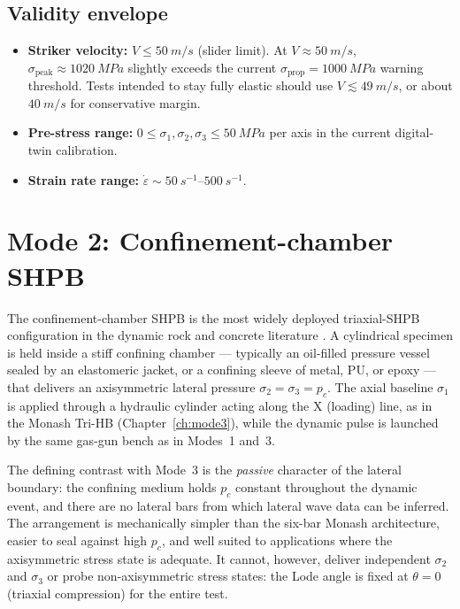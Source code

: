 \documentclass[11pt,a4paper,openany]{book}
\providecommand{\SI}[2]{\qty{#1}{#2}}
\providecommand{\SIrange}[3]{\qtyrange{#1}{#2}{#3}}
\theoremstyle{handbook}
\newcommand{\sig}{\sigma}
\newcommand{\eps}{\varepsilon}
\newcommand{\epsdot}{\dot\eps}
\newcommand{\sigprop}{\sig_{\text{prop}}}
\newcommand{\sigpeak}{\sig_{\text{peak}}}
\begin{document}
\section{Validity envelope}\label{sec:mode1-envelope}

\begin{itemize}[leftmargin=*]
  \item \textbf{Striker velocity:} $V\le\SI{50}{m/s}$ (slider limit). At
        $V\approx\SI{50}{m/s}$, $\sigpeak\approx\SI{1020}{MPa}$ slightly
        exceeds the current $\sigprop=\SI{1000}{MPa}$ warning threshold.
        Tests intended to stay fully elastic should use
        $V\lesssim\SI{49}{m/s}$, or about $\SI{40}{m/s}$ for conservative
        margin.
  \item \textbf{Pre-stress range:} $0\le\sig_1,\sig_2,\sig_3\le\SI{50}{MPa}$
        per axis in the current digital-twin calibration.
  \item \textbf{Strain rate range:} $\epsdot\sim\SIrange{50}{500}{s^{-1}}$.
\end{itemize}

\chapter{Mode 2: Confinement-chamber SHPB}\label{ch:mode2}

The confinement-chamber SHPB is the most widely deployed triaxial-SHPB
configuration in the dynamic rock and concrete literature
\cite{ChenSong2011,XiaYao2015,Zhou2010}. A cylindrical specimen is held
inside a stiff confining chamber --- typically an oil-filled pressure
vessel sealed by an elastomeric jacket, or a confining sleeve of metal,
PU, or epoxy --- that delivers an axisymmetric lateral pressure
$\sig_2=\sig_3=p_c$. The axial baseline $\sig_1$ is applied through a
hydraulic cylinder acting along the X (loading) line, as in the Monash
Tri-HB (Chapter~\ref{ch:mode3}), while the dynamic pulse is launched by
the same gas-gun bench as in Modes~1 and~3.

The defining contrast with Mode~3 is the \emph{passive} character of the
lateral boundary: the confining medium holds $p_c$ constant throughout
the dynamic event, and there are no lateral bars from which lateral wave
data can be inferred. The arrangement is mechanically simpler than the
six-bar Monash architecture, easier to seal against high $p_c$, and well
suited to applications where the axisymmetric stress state is adequate.
It cannot, however, deliver independent $\sig_2$ and $\sig_3$ or probe
non-axisymmetric stress states: the Lode angle is fixed at
$\theta=0$ (triaxial compression) for the entire test.
\end{document}
